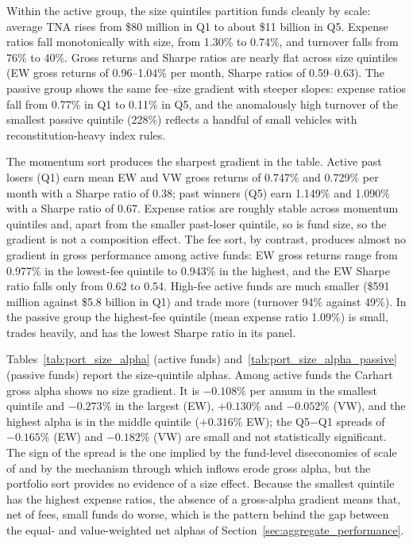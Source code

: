 \documentclass[12pt, oneside]{report}
\begin{document}
Within the active group, the size quintiles partition funds cleanly by
scale: average TNA rises from \$80 million in Q1 to about \$11 billion in
Q5. Expense ratios fall monotonically with size, from 1.30\% to 0.74\%,
and turnover falls from 76\% to 40\%. Gross returns and Sharpe ratios are
nearly flat across size quintiles (EW gross returns of 0.96--1.04\% per
month, Sharpe ratios of 0.59--0.63). The passive group shows the same
fee--size gradient with steeper slopes: expense ratios fall from 0.77\% in
Q1 to 0.11\% in Q5, and the anomalously high turnover of the smallest
passive quintile (228\%) reflects a handful of small vehicles with
reconstitution-heavy index rules.

The momentum sort produces the sharpest gradient in the table. Active past
losers (Q1) earn mean EW and VW gross returns of 0.747\% and 0.729\% per
month with a Sharpe ratio of 0.38; past winners (Q5) earn 1.149\% and
1.090\% with a Sharpe ratio of 0.67. Expense ratios are roughly stable
across momentum quintiles and, apart from the smaller past-loser
quintile, so is fund size, so the gradient is not a composition
effect. The fee sort, by contrast, produces almost no
gradient in gross performance among active funds: EW gross returns range
from 0.977\% in the lowest-fee quintile to 0.943\% in the highest, and the
EW Sharpe ratio falls only from 0.62 to 0.54. High-fee active funds are
much smaller (\$591 million against \$5.8 billion in Q1) and trade more
(turnover 94\% against 49\%). In the passive group the highest-fee
quintile (mean expense ratio 1.09\%) is small, trades heavily, and has
the lowest Sharpe ratio in its panel.

Tables~\ref{tab:port_size_alpha} (active funds) and~\ref{tab:port_size_alpha_passive} (passive funds) report the size-quintile alphas. Among
active funds the Carhart gross alpha shows no size gradient. It is
$-0.108\%$ per annum in the smallest quintile and $-0.273\%$ in the
largest (EW), $+0.130\%$ and $-0.052\%$ (VW), and the highest alpha is in
the middle quintile ($+0.316\%$ EW); the Q5$-$Q1 spreads of $-0.165\%$
(EW) and $-0.182\%$ (VW) are small and not statistically significant.
The sign of the spread is the one implied by the fund-level diseconomies
of scale of \textcite{ChenHongHuangKubik2004} and by the
\textcite{BerkGreen2004} mechanism through which inflows erode gross
alpha, but the portfolio sort provides no evidence of a size effect.
Because the smallest quintile has the highest expense ratios, the absence
of a gross-alpha gradient means that, net of fees, small funds do worse,
which is the pattern behind the gap between the equal- and value-weighted
net alphas of Section~\ref{sec:aggregate_performance}.
\end{document}
